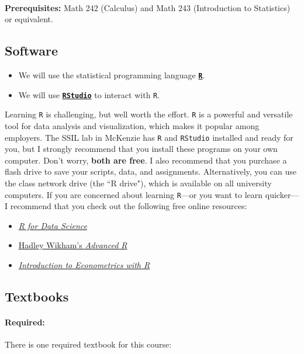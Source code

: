 \documentclass[11pt]{article}
\begin{document}
\textbf {\large \\ Prerequisites:} Math 242 (Calculus) and Math 243 (Introduction to Statistics) or equivalent.

\subsection*{Software}

\begin{itemize}
  \item We will use the statistical programming language \href{https://www.r-project.org/}{\textbf{\texttt{R}}}.
  \item We will use \href{https://www.rstudio.com}{\textbf{\texttt{RStudio}}} to interact with \texttt{R}.
\end{itemize}
Learning \texttt{R} is challenging, but well worth the effort. \texttt{R} is a powerful and versatile tool for data analysis and visualization, which makes it popular among employers. The SSIL lab in McKenzie has \texttt{R} and \texttt{RStudio} installed and ready for you, but I strongly recommend that you install these programs on your own computer. Don't worry, \textbf{both are free}. I also recommend that you purchase a flash drive to save your scripts, data, and assignments. Alternatively, you can use the class network drive (the ``R drive"), which is available on all university computers.
\newpage 
If you are concerned about learning \texttt{R}---or you want to learn quicker---I recommend that you check out the following free online resources:
\begin{itemize}

  \item \href{https://r4ds.had.co.nz/index.html}{ \textit{\textcolor{PineGreen}{R for Data Science}}}
  \item \href{http://adv-r.had.co.nz/}{Hadley Wikham's \textit{\textcolor{PineGreen}{Advanced R}}}
    \item \href{https://www.econometrics-with-r.org/index.html}{\textit{\textcolor{PineGreen}{ Introduction to Econometrics with R}}}
\end{itemize}

\subsection*{Textbooks}

\paragraph{Required:} There is one required textbook for this course:
\end{document}
